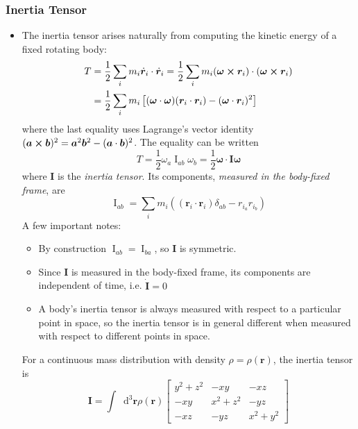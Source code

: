\documentclass[11pt, a4paper]{article}
\newcommand{\diff}{\mathop{}\!\mathrm{d}} %
\newcommand{\bdot}[1]{\dot{\bm{#1}}}
\newcommand{\mat}[1]{\mathbf{#1}}
\begin{document}
\subsubsection{Inertia Tensor}
\begin{itemize}
	\item The inertia tensor arises naturally from computing the kinetic energy of a fixed rotating body:
	\begin{align*}
		T &= \frac{1}{2}\sum_{i} m_{i} \bdot{r}_{i} \cdot \bdot{r}_{i} = \frac{1}{2}\sum_{i} m_{i} (\bm{\omega} \cross \bm{r}_{i}) \cdot (\bm{\omega} \cross \bm{r}_{i})\\
		&= \frac{1}{2}\sum_{i} m_{i}\left[ (\bm{\omega} \cdot \bm{\omega}) (\bm{r}_{i} \cdot \bm{r}_{i} ) - (\bm{\omega} \cdot \bm{r}_{i})^2\right]
	\end{align*}
	where the last equality uses Lagrange's vector identity $ (\bm{a}\cross \bm{b})^{2} = \bm{a}^{2}\bm{b}^{2} - (\bm{a}\cdot \bm{b})^{2}$. The equality can be written 
	\begin{equation*}
		T = \frac{1}{2} \omega_{a} \operatorname{I}_{ab} \omega_{b} = \frac{1}{2} \bm{\omega} \cdot \mat{I} \bm{\omega}
	\end{equation*}
	where $ \mathbf{I} $ is the \textit{inertia tensor}. Its components, \textit{measured in the body-fixed frame}, are
	\begin{equation*}
		\operatorname{I}_{ab} = \sum_{i}m_{i} \left((\bm{r}_{i} \cdot \bm{r}_{i})\delta_{a b} - r_{i_{a}} r_{i_{b}} \right)
	\end{equation*}
	A few important notes:
	\begin{itemize}
		\item  By construction $ \operatorname{I}_{ab} = \operatorname{I}_{ba} $, so $ \mat{I} $ is symmetric.
		
		\item Since $ \mat{I} $ is measured in the body-fixed frame, its components are independent of time, i.e. $ \dot{\mat{I}} = 0$
		
		\item A body's inertia tensor is always measured with respect to a particular point in space, so the inertia tensor is in general different when measured with respect to different points in space. 
	\end{itemize} 
	For a continuous mass distribution with density $ \rho = \rho(\bm{r}) $, the inertia tensor is
	\[
		\mathbf{I} = \int \diff^{3}\bm{r} \rho(\bm{r}) 
		\begin{bmatrix}
			y^2 + z^2 & - xy & - xz\\
			-xy & x^2 + z^2 & -yz\\
			-xz & -yz & x^2 + y^2
		\end{bmatrix}
	\]
	

\end{itemize}
\end{document}

